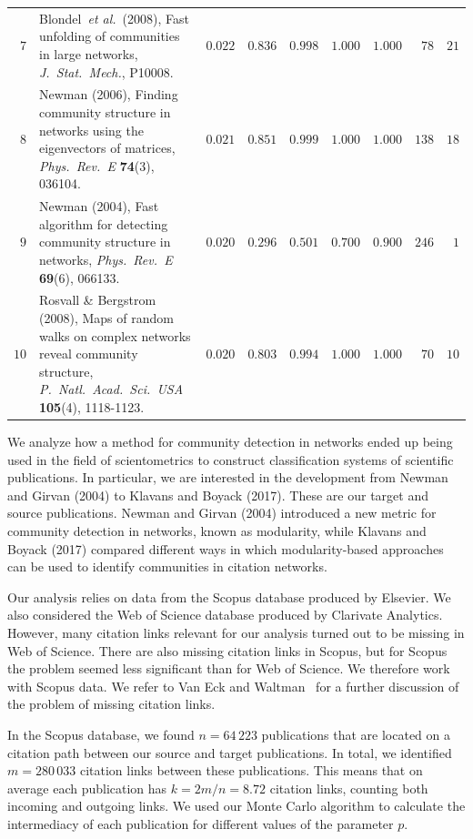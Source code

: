\documentclass[9pt,twocolumn,twoside,lineno]{pnas-alt}
\theoremstyle{definition}
\renewcommand{\etal}{~\emph{et al.}\xspace}
\begin{document}
\begin{sansmath}
\begin{table}[b!]
\begin{tabular}{rp{9.75cm}rrrrrrr}
    $7$ & Blondel\etal~(2008), Fast unfolding of communities in large networks, \textit{J.\ Stat.\ Mech.}, P10008. & $0.022$ & $0.836$ & $0.998$ & $1.000$ & $1.000$ & $78$ & $21$ \\
    $8$ & Newman (2006), Finding community structure in networks using the eigenvectors of matrices, \textit{Phys.\ Rev.\ E} \textbf{74}(3), 036104. & $0.021$ & $0.851$ & $0.999$ & $1.000$ & $1.000$ & $138$ & $18$ \\
    $9$ & Newman (2004), Fast algorithm for detecting community structure in networks, \textit{Phys.\ Rev.\ E} \textbf{69}(6), 066133. & $0.020$ & $0.296$ & $0.501$ & $0.700$ & $0.900$ & $246$ & $1$ \\
    $10$ & Rosvall \& Bergstrom (2008), Maps of random walks on complex networks reveal community structure, \textit{P.\ Natl.\ Acad.\ Sci.\ USA} \textbf{105}(4), 1118-1123. & $0.020$ & $0.803$ & $0.994$ & $1.000$ & $1.000$ & $70$ & $10$ \\\bottomrule
  \end{tabular}
  \label{tbl:Q}
\end{table}\end{sansmath}

We analyze how a method for community detection in networks ended up being used in the field of scientometrics to construct classification systems of scientific publications. In particular, we are interested in the development from Newman and Girvan (2004) to Klavans and Boyack (2017). These are our target and source publications. Newman and Girvan (2004) introduced a new metric for community detection in networks, known as modularity, while Klavans and Boyack (2017) compared different ways in which modularity-based approaches can be used to identify communities in citation networks.

Our analysis relies on data from the Scopus database produced by Elsevier. We also considered the Web of Science database produced by Clarivate Analytics. However, many citation links relevant for our analysis turned out to be missing in Web of Science. There are also missing citation links in Scopus, but for Scopus the problem seemed less significant than for Web of Science. We therefore work with Scopus data. We refer to Van Eck and Waltman~\cite{VanEck2017} for a further discussion of the problem of missing citation links.

In the Scopus database, we found $n = 64\,223$ publications that are located on a citation path between our source and target publications. In total, we identified $m = 280\,033$ citation links between these publications. This means that on average each publication has $k = 2m / n = 8.72$ citation links, counting both incoming and outgoing links. We used our Monte Carlo algorithm to calculate the intermediacy of each publication for different values of the parameter $p$.
\end{document}
